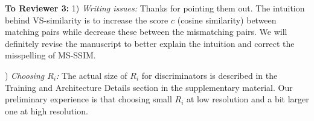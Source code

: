 \documentclass[10pt,twocolumn,letterpaper]{article}
\begin{document}
\noindent
\textbf{To Reviewer 3:} 1) \textit{Writing issues:} Thanks for pointing them out. 
The intuition behind VS-similarity is to increase the score $c$ (cosine similarity) between matching pairs while decrease these between the mismatching pairs.  We will definitely revise the manuscript to better explain the intuition and correct the misspelling of MS-SSIM.

) \textit{Choosing $R_i$:} The actual size of $R_i$ for discriminators is described in the Training and Architecture Details section in the supplementary material. Our preliminary experience is that choosing small $R_i$ at low resolution and a bit larger one at high resolution.




%		

%
%
%
\end{document}

